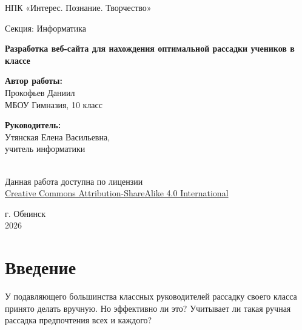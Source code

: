 \documentclass[12pt,a4paper]{extarticle} %
\begin{document}
	
	\begin{titlepage}
		\begin{center}
			НПК «Интерес. Познание. Творчество» \\
			\vspace{4cm}
			
			Секция: Информатика \\
			\vspace{1cm}
			
			{\Large \textbf{Разработка веб-сайта для нахождения оптимальной рассадки учеников в классе}} \\
			\vfill
			
			\begin{flushright}
				\begin{minipage}{0.5\textwidth}
					\textbf{Автор работы:} \\
					Прокофьев Даниил \\
					МБОУ Гимназия, 10 класс \\
					\vspace{0.5cm}
					
					\textbf{Руководитель:} \\
					Утянская Елена Васильевна, \\
					учитель информатики
				\end{minipage}
			\end{flushright}
			
			\vfill
			{\begingroup
				\color{gray}
				\footnotesize %
				\ccbysa \\ %
				Данная работа доступна по лицензии \\
				\href{https://creativecommons.org/licenses/by-sa/4.0/deed.ru}{Creative Commons Attribution-ShareAlike 4.0 International}
				\endgroup}
			
			\vspace{0.8cm}
			г. Обнинск \\
			2026
		\end{center}
	\end{titlepage}
	
	\newpage
	\setcounter{page}{2}
	
	\tableofcontents
	\newpage
	
	\section*{Введение}
	У подавляющего большинства классных руководителей рассадку своего класса принято делать вручную. Но эффективно ли это? Учитывает ли такая ручная рассадка предпочтения всех и каждого?
	
\end{document}
